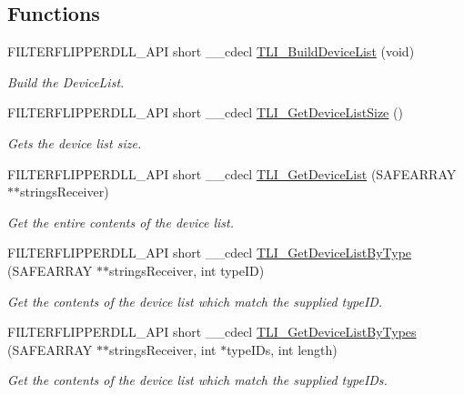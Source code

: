 \subsection*{Functions}
\begin{DoxyCompactItemize}
\item 
F\+I\+L\+T\+E\+R\+F\+L\+I\+P\+P\+E\+R\+D\+L\+L\+\_\+\+A\+PI short \+\_\+\+\_\+cdecl \hyperlink{group___filter_flipper_ga031def06ae0f33d88e550d252b576a33}{T\+L\+I\+\_\+\+Build\+Device\+List} (void)
\begin{DoxyCompactList}\small\item\em Build the Device\+List. \end{DoxyCompactList}\item 
F\+I\+L\+T\+E\+R\+F\+L\+I\+P\+P\+E\+R\+D\+L\+L\+\_\+\+A\+PI short \+\_\+\+\_\+cdecl \hyperlink{group___filter_flipper_gae5163b0be34e0ebe2cccb770adab48f8}{T\+L\+I\+\_\+\+Get\+Device\+List\+Size} ()
\begin{DoxyCompactList}\small\item\em Gets the device list size. \end{DoxyCompactList}\item 
F\+I\+L\+T\+E\+R\+F\+L\+I\+P\+P\+E\+R\+D\+L\+L\+\_\+\+A\+PI short \+\_\+\+\_\+cdecl \hyperlink{group___filter_flipper_ga1669b39290ccf3200dcda8217f694969}{T\+L\+I\+\_\+\+Get\+Device\+List} (S\+A\+F\+E\+A\+R\+R\+AY $\ast$$\ast$strings\+Receiver)
\begin{DoxyCompactList}\small\item\em Get the entire contents of the device list. \end{DoxyCompactList}\item 
F\+I\+L\+T\+E\+R\+F\+L\+I\+P\+P\+E\+R\+D\+L\+L\+\_\+\+A\+PI short \+\_\+\+\_\+cdecl \hyperlink{group___filter_flipper_ga055e1d4b21fa2ac4f5dde17aa8c697b2}{T\+L\+I\+\_\+\+Get\+Device\+List\+By\+Type} (S\+A\+F\+E\+A\+R\+R\+AY $\ast$$\ast$strings\+Receiver, int type\+ID)
\begin{DoxyCompactList}\small\item\em Get the contents of the device list which match the supplied type\+ID. \end{DoxyCompactList}\item 
F\+I\+L\+T\+E\+R\+F\+L\+I\+P\+P\+E\+R\+D\+L\+L\+\_\+\+A\+PI short \+\_\+\+\_\+cdecl \hyperlink{group___filter_flipper_gad804300914c144f54b9cd64441615206}{T\+L\+I\+\_\+\+Get\+Device\+List\+By\+Types} (S\+A\+F\+E\+A\+R\+R\+AY $\ast$$\ast$strings\+Receiver, int $\ast$type\+I\+Ds, int length)
\begin{DoxyCompactList}\small\item\em Get the contents of the device list which match the supplied type\+I\+Ds. \end{DoxyCompactList}\item 
$$
\end{DoxyCompactItemize}
